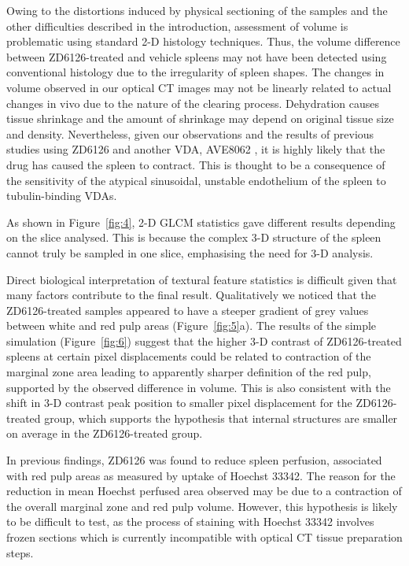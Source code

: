 	Owing to the distortions induced by physical sectioning of the samples and the other difficulties described in the introduction, assessment of volume is problematic using standard 2-D histology techniques. Thus, the volume difference between ZD6126-treated and vehicle spleens may not have been detected using conventional histology due to the irregularity of spleen shapes. The changes in volume observed in our optical CT images may not be linearly related to actual changes in vivo due to the nature of the clearing process. Dehydration causes tissue shrinkage and the amount of shrinkage may depend on original tissue size and density. Nevertheless, given our observations and the results of previous studies using ZD6126 and another VDA, AVE8062 \cite{cullistumour2006, guffroyevaluation2004}, it is highly likely that the drug has caused the spleen to contract. This is thought to be a consequence of the sensitivity of the atypical sinusoidal, unstable endothelium of the spleen \cite{groomthe1987} to tubulin-binding VDAs. 
	
	As shown in Figure~\ref{fig:4}, 2-D GLCM statistics gave different results depending on the slice analysed. This is because the complex 3-D structure of the spleen cannot truly be sampled in one slice, emphasising the need for 3-D analysis. 
	
	Direct biological interpretation of textural feature statistics is difficult given that many factors contribute to the final result. Qualitatively we noticed that the ZD6126-treated samples appeared to have a steeper gradient of grey values between white and red pulp areas (Figure~\ref{fig:5}a). The results of the simple simulation (Figure~\ref{fig:6}) suggest that the higher 3-D contrast of ZD6126-treated spleens at certain pixel displacements could be related to contraction of the marginal zone area leading to apparently sharper definition of the red pulp, supported by the observed difference in volume. This is also consistent with the shift in 3-D contrast peak position to smaller pixel displacement for the ZD6126-treated group, which supports the hypothesis that internal structures are smaller on average in the ZD6126-treated group.
	
	In previous findings, ZD6126 was found to reduce spleen perfusion, associated with red pulp areas as measured by uptake of Hoechst 33342. \cite{cullistumour2006} The reason for the reduction in mean Hoechst perfused area observed may be due to a contraction of the overall marginal zone and red pulp volume. However, this hypothesis is likely to be difficult to test, as the process of staining with Hoechst 33342 involves frozen sections which is currently incompatible with optical CT tissue preparation steps. 
	
